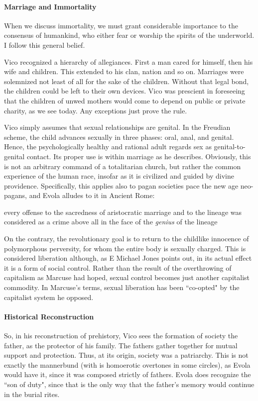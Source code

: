 \paragraph{Marriage and Immortality}
\begin{quotex}
When we discuss immortality, we must grant considerable importance to the consensus of humankind, who either fear or worship the spirits of the underworld. I follow this general belief. 

\end{quotex}
Vico recognized a hierarchy of allegiances. First a man cared for himself, then his wife and children. This extended to his clan, nation and so on. Marriages were solemnized not least of all for the sake of the children. Without that legal bond, the children could be left to their own devices. Vico was prescient in foreseeing that the children of unwed mothers would come to depend on public or private charity, as we see today. Any exceptions just prove the rule.

Vico simply assumes that sexual relationships are genital. In the Freudian scheme, the child advances sexually in three phases: oral, anal, and genital. Hence, the psychologically healthy and rational adult regards sex as genital-to-genital contact. Its proper use is within marriage as he describes. Obviously, this is not an arbitrary command of a totalitarian church, but rather the common experience of the human race, insofar as it is civilized and guided by divine providence. Specifically, this applies also to pagan societies pace the new age neo-pagans, and Evola alludes to it in Ancient Rome:

\begin{quotex}
every offense to the sacredness of aristocratic marriage and to the lineage was considered as a crime above all in the face of the \emph{genius} of the lineage 

\end{quotex}
On the contrary, the revolutionary goal is to return to the childlike innocence of polymorphous perversity, for whom the entire body is sexually charged. This is considered liberation although, as E Michael Jones points out, in its actual effect it is a form of social control. Rather than the result of the overthrowing of capitalism as Marcuse had hoped, sexual control becomes just another capitalist commodity. In Marcuse's terms, sexual liberation has been ``co-opted" by the capitalist system he opposed.

\paragraph{Historical Reconstruction}
So, in his reconstruction of prehistory, Vico sees the formation of society the father, as the protector of his family. The fathers gather together for mutual support and protection. Thus, at its origin, society was a patriarchy. This is not exactly the mannerbund (with is homoerotic overtones in some circles), as Evola would have it, since it was composed strictly of fathers. Evola does recognize the ``son of duty", since that is the only way that the father's memory would continue in the burial rites.

